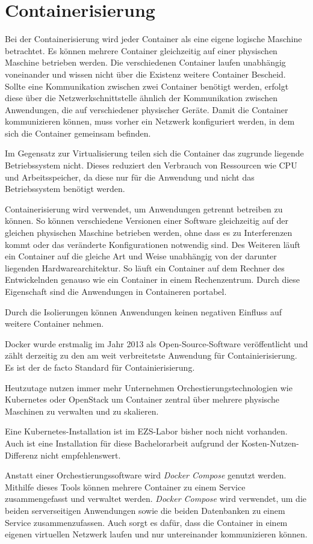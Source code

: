 \section{Containerisierung} \label{sec:Containerisierung}
Bei der Containerisierung wird jeder Container als eine eigene logische Maschine betrachtet. Es können mehrere Container gleichzeitig auf einer physischen Maschine betrieben werden. 
Die verschiedenen Container laufen unabhängig voneinander und wissen nicht über die Existenz weitere Container Bescheid. Sollte eine Kommunikation zwischen zwei Container benötigt werden, erfolgt diese über die Netzwerkschnittstelle ähnlich der Kommunikation zwischen Anwendungen, die auf verschiedener physischer Geräte. \cite{boersmaContainerizationDefinitionBest2019} Damit die Container kommunizieren können, muss vorher ein Netzwerk konfiguriert werden, in dem sich die Container gemeinsam befinden.

Im Gegensatz zur Virtualisierung teilen sich die Container das zugrunde liegende Betriebssystem nicht. Dieses reduziert den Verbrauch von Ressourcen wie CPU und Arbeitsspeicher, da diese nur für die Anwendung und nicht das Betriebssystem benötigt werden.

Containerisierung wird verwendet, um Anwendungen getrennt betreiben zu können. So können verschiedene Versionen einer Software gleichzeitig auf der gleichen physischen Maschine betrieben werden, ohne dass es zu Interferenzen kommt oder das veränderte Konfigurationen notwendig sind. Des Weiteren läuft ein Container auf die gleiche Art und Weise unabhängig von der darunter liegenden Hardwarearchitektur. So läuft ein Container auf dem Rechner des Entwickelnden genauso wie ein Container in einem Rechenzentrum. Durch diese Eigenschaft sind die Anwendungen in Containeren portabel. \cite{boersmaContainerizationDefinitionBest2019}

Durch die Isolierungen können Anwendungen keinen negativen Einfluss auf weitere Container nehmen.

Docker wurde erstmalig im Jahr 2013 als Open-Source-Software veröffentlicht und zählt derzeitig zu den am weit verbreitetste Anwendung für Containierisierung. Es ist der de facto Standard für Containierisierung. 
\cite{boersmaContainerizationDefinitionBest2019}

Heutzutage nutzen immer mehr Unternehmen Orchestierungstechnologien wie Kubernetes oder OpenStack um Container zentral über mehrere physische Maschinen zu verwalten und zu skalieren.
\cite{gaviganHistoryAngular2018}

Eine Kubernetes-Installation ist im EZS-Labor bisher noch nicht vorhanden. Auch ist eine Installation für diese Bachelorarbeit aufgrund der Kosten-Nutzen-Differenz nicht empfehlenswert.

Anstatt einer Orchestierungssoftware wird \textit{Docker Compose} genutzt werden.
Mithilfe dieses Tools können mehrere Container zu einem Service zusammengefasst und verwaltet werden. \textit{Docker Compose} wird verwendet, um die beiden serverseitigen Anwendungen sowie die beiden Datenbanken zu einem Service zusammenzufassen. Auch sorgt es dafür, dass die Container in einem eigenen virtuellen Netzwerk laufen und nur untereinander kommunizieren können. \cite{dockerinc.OverviewDockerCompose2020} 